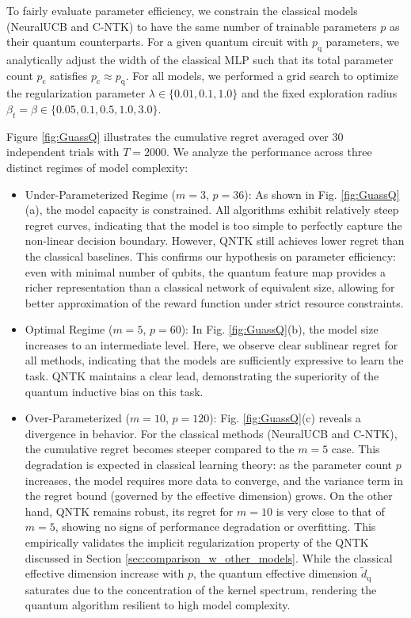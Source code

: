 \documentclass[pdflatex,sn-mathphys-num]{sn-jnl}%
\theoremstyle{thmstyleone}%
\theoremstyle{thmstyletwo}%
\theoremstyle{thmstylethree}%
\begin{document}

To fairly evaluate parameter efficiency, we constrain the classical models (NeuralUCB and C-NTK) to have the same number of trainable parameters $p$  as their quantum counterparts. For a given quantum circuit with $p_{\mathrm{q}}$ parameters, we analytically adjust the width of the classical MLP such that its total parameter count $p_{\mathrm{c}}$ satisfies $p_{\mathrm{c}} \approx p_{\mathrm{q}}$. 
For all models, we performed a grid search to optimize the regularization parameter $\lambda \in \{0.01, 0.1, 1.0\}$ and the fixed exploration radius $\beta_t = \beta \in \{0.05,0.1,0.5,1.0,3.0\}$.

Figure \ref{fig:GuassQ} illustrates the cumulative regret averaged over 30 independent trials with $T=2000$. We analyze the performance across three distinct regimes of model complexity:
\begin{itemize}
    \item Under-Parameterized Regime ($m=3$, $p=36$): As shown in Fig. \ref{fig:GuassQ}(a), the model capacity is constrained. All algorithms exhibit relatively steep regret curves, indicating that the model is too simple to perfectly capture the non-linear decision boundary. However, QNTK still achieves lower regret than the classical baselines. This confirms our hypothesis on parameter efficiency: even with minimal number of qubits, the quantum feature map provides a richer representation than a classical network of equivalent size, allowing for better approximation of the reward function under strict resource constraints.
    
    \item Optimal Regime ($m=5$, $p= 60$): In Fig. \ref{fig:GuassQ}(b), the model size increases to an intermediate level. Here, we observe clear sublinear regret for all methods, indicating that the models are sufficiently expressive to learn the task. QNTK maintains a clear lead, demonstrating the superiority of the quantum inductive bias on this task.
    
    \item Over-Parameterized ($m=10$, $p= 120$): Fig. \ref{fig:GuassQ}(c) reveals a divergence in behavior. For the classical methods (NeuralUCB and C-NTK), the cumulative regret becomes steeper compared to the $m=5$ case. This degradation is expected in classical learning theory: as the parameter count $p$ increases, the model requires more data to converge, and the variance term in the regret bound (governed by the effective dimension) grows. On the other hand, QNTK remains robust, its regret for $m=10$ is very close to that of $m=5$, showing no signs of performance degradation or overfitting. This empirically validates the implicit regularization property of the QNTK discussed in Section \ref{sec:comparison_w_other_models}. While the classical effective dimension increase with $p$, the quantum effective dimension $\widetilde{d}_{\mathrm{q}}$ saturates due to the concentration of the kernel spectrum, rendering the quantum algorithm resilient to high model complexity. 
\end{itemize}
\end{document}
